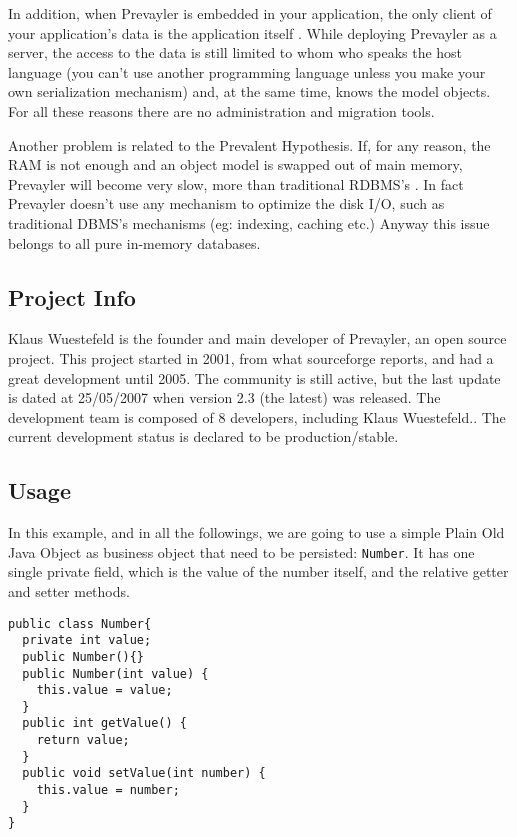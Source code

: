 			In addition, when Prevayler is embedded in your application, the only client 
			of your application's data is the application itself \cite{Hobbs}. While deploying Prevayler as a server, 
			the access to the data is still limited to whom who speaks the host 
			language (you can't use another programming language unless you make your own serialization mechanism) and, 
			at the same time, knows the model objects. For all these reasons there are no administration and migration tools.
						
			Another problem is related to the Prevalent Hypothesis. If, for any reason, the RAM is not enough and 
			an object model is 
			swapped out of main memory, Prevayler will become very slow, more than traditional RDBMS's \cite{Miller}. 
			In fact Prevayler doesn't use any mechanism to optimize the disk I/O, such as traditional DBMS's mechanisms 
			(eg: indexing, caching etc.) Anyway this issue belongs to all pure in-memory databases.
					
			\subsection{Project Info}
			Klaus Wuestefeld is the founder and main developer of Prevayler, an open source project. This project 
			started in 2001, from what sourceforge reports, and had a great development until 2005. 
			The community is still active, but the 
			last update is dated at 25/05/2007 when version 2.3 (the latest) was released. The development team is composed 
			of 8 developers, including Klaus Wuestefeld.. The current development status is declared to be production/stable.	
			
			\subsection{Usage}
			In this example, and in all the followings, we are going to use a simple Plain Old 
			Java Object as business object that need to be persisted: \lstinline!Number!. It has one single 
			private field, which is the value of the number itself, and the relative getter and 
			setter methods.
			\begin{lstlisting} 
public class Number{
  private int value;	
  public Number(){}	
  public Number(int value) {
    this.value = value;
  }
  public int getValue() {
    return value;
  }
  public void setValue(int number) {
    this.value = number;
  }	
}
   		\end{lstlisting} 
			
